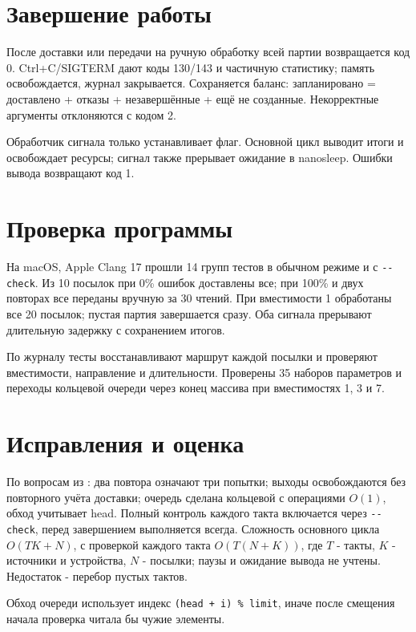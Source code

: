 \section{Завершение работы}
\begin{remark}
После доставки или передачи на ручную обработку всей партии возвращается код 0. Ctrl+C/SIGTERM дают коды 130/143 и частичную статистику; память освобождается, журнал закрывается. Сохраняется баланс: запланировано = доставлено + отказы + незавершённые + ещё не созданные. Некорректные аргументы отклоняются с кодом 2.

Обработчик сигнала только устанавливает флаг. Основной цикл выводит итоги и освобождает ресурсы; сигнал также прерывает ожидание в nanosleep. Ошибки вывода возвращают код 1.

\end{remark}

\clearpage
\section{Проверка программы}
\begin{solution}
На macOS, Apple Clang 17 прошли 14 групп тестов в обычном режиме и с \texttt{-{}-check}. Из 10 посылок при 0\% ошибок доставлены все; при 100\% и двух повторах все переданы вручную за 30 чтений. При вместимости 1 обработаны все 20 посылок; пустая партия завершается сразу. Оба сигнала прерывают длительную задержку с сохранением итогов.

По журналу тесты восстанавливают маршрут каждой посылки и проверяют вместимости, направление и длительности. Проверены 35 наборов параметров и переходы кольцевой очереди через конец массива при вместимостях 1, 3 и 7.

\end{solution}

\section{Исправления и оценка}
\begin{exercise}
По вопросам из : два повтора означают три попытки; выходы освобождаются без повторного учёта доставки; очередь сделана кольцевой с операциями $O(1)$, обход учитывает head. Полный контроль каждого такта включается через \texttt{-{}-check}, перед завершением выполняется всегда. Сложность основного цикла $O(TK+N)$, с проверкой каждого такта $O(T(N+K))$, где $T$ - такты, $K$ - источники и устройства, $N$ - посылки; паузы и ожидание вывода не учтены. Недостаток - перебор пустых тактов.

Обход очереди использует индекс \texttt{(head + i) \% limit}, иначе после смещения начала проверка читала бы чужие элементы.

\end{exercise}

